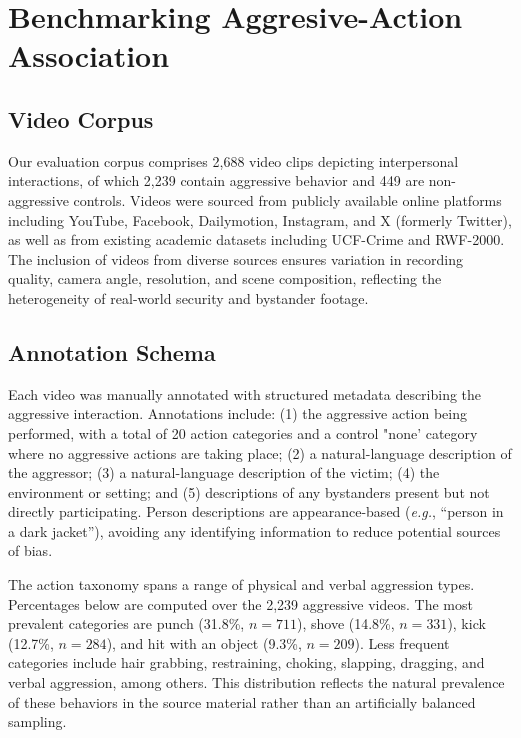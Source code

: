 \section{Benchmarking Aggresive-Action Association}

\subsection{Video Corpus}

Our evaluation corpus comprises 2,688 video clips depicting interpersonal interactions, of which 2,239 contain aggressive behavior and 449 are non-aggressive controls.
Videos were sourced from publicly available online platforms including YouTube, Facebook, Dailymotion, Instagram, and X (formerly Twitter), as well as from existing academic datasets including UCF-Crime and RWF-2000.
The inclusion of videos from diverse sources ensures variation in recording quality, camera angle, resolution, and scene composition, reflecting the heterogeneity of real-world security and bystander footage.

\subsection{Annotation Schema}

Each video was manually annotated with structured metadata describing the aggressive interaction.
Annotations include: (1) the aggressive action being performed, with a total of 20 action categories and a control "none' category where no aggressive actions are taking place; (2) a natural-language description of the aggressor; (3) a natural-language description of the victim; (4) the environment or setting; and (5) descriptions of any bystanders present but not directly participating.
Person descriptions are appearance-based (\textit{e.g.}, ``person in a dark jacket''), avoiding any identifying information to reduce potential sources of bias.

The action taxonomy spans a range of physical and verbal aggression types.
Percentages below are computed over the 2,239 aggressive videos.
The most prevalent categories are punch (31.8\%, $n = 711$), shove (14.8\%, $n = 331$), kick (12.7\%, $n = 284$), and hit with an object (9.3\%, $n = 209$).
Less frequent categories include hair grabbing, restraining, choking, slapping, dragging, and verbal aggression, among others.
This distribution reflects the natural prevalence of these behaviors in the source material rather than an artificially balanced sampling.

